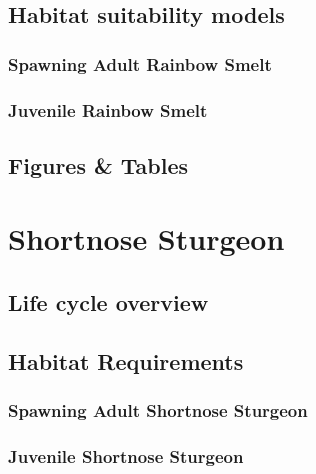 \documentclass[
]{book}
\begin{document}
\hypertarget{habitat-suitability-models-7}{%
\section{Habitat suitability models}\label{habitat-suitability-models-7}}

\hypertarget{spawning-adult-rainbow-smelt-1}{%
\subsection{Spawning Adult Rainbow Smelt}\label{spawning-adult-rainbow-smelt-1}}

\hypertarget{juvenile-rainbow-smelt-1}{%
\subsection{Juvenile Rainbow Smelt}\label{juvenile-rainbow-smelt-1}}

\hypertarget{figures-tables-7}{%
\section{Figures \& Tables}\label{figures-tables-7}}

\hypertarget{shortnose-sturgeon}{%
\chapter{Shortnose Sturgeon}\label{shortnose-sturgeon}}

\hypertarget{life-cycle-overview-8}{%
\section{Life cycle overview}\label{life-cycle-overview-8}}

\hypertarget{habitat-requirements-8}{%
\section{Habitat Requirements}\label{habitat-requirements-8}}

\hypertarget{spawning-adult-shortnose-sturgeon}{%
\subsection{Spawning Adult Shortnose Sturgeon}\label{spawning-adult-shortnose-sturgeon}}

\hypertarget{juvenile-shortnose-sturgeon}{%
\subsection{Juvenile Shortnose Sturgeon}\label{juvenile-shortnose-sturgeon}}
\end{document}
